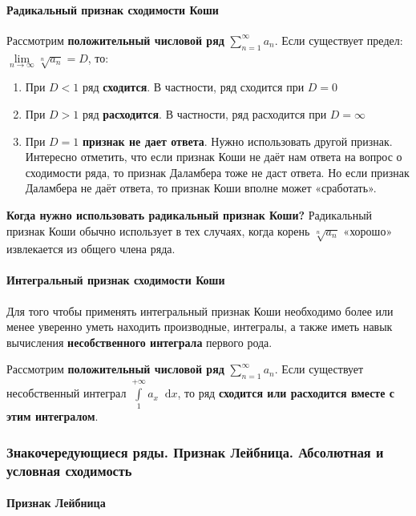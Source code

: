 \documentclass{article}
\newcommand*\diff{\mathop{}\!\mathrm{d}}
\begin{document}
\paragraph{Радикальный признак сходимости Коши}

Рассмотрим \textbf{положительный числовой ряд} $\sum\limits_{n = 1}^{\infty} a_{n}$. Если существует предел: $\lim\limits_{n \to \infty} \sqrt[n]{a_{n}} = D$, то:

\begin{enumerate}
    \item При $D < 1$ ряд \textbf{сходится}. В частности, ряд сходится при $D = 0$
    \item При $D > 1$ ряд \textbf{расходится}. В частности, ряд расходится при $D = \infty$
    \item При $D = 1$ \textbf{признак не дает ответа}. Нужно использовать другой признак. Интересно отметить, что если признак Коши не даёт нам ответа на вопрос о сходимости ряда, то признак Даламбера тоже не даст ответа. Но если признак Даламбера не даёт ответа, то признак Коши вполне может «сработать».
\end{enumerate}

\textbf{Когда нужно использовать радикальный признак Коши?} Радикальный признак Коши обычно использует в тех случаях, когда корень $\sqrt[n]{a_{n}}$ «хорошо» извлекается из общего члена ряда.

\paragraph{Интегральный признак сходимости Коши}

Для того чтобы применять интегральный признак Коши необходимо более или менее уверенно уметь находить производные, интегралы, а также иметь навык вычисления \textbf{несобственного интеграла} первого рода.

\hfill

Рассмотрим \textbf{положительный числовой ряд} $\sum\limits_{n = 1}^{\infty} a_{n}$. Если существует несобственный интеграл $\int\limits_{1}^{+\infty} a_{x} \diff x$, то ряд \textbf{сходится или расходится вместе с этим интегралом}.

\subsubsection{Знакочередующиеся ряды. Признак Лейбница.
Абсолютная и условная сходимость}

\paragraph{Признак Лейбница}
\end{document}
